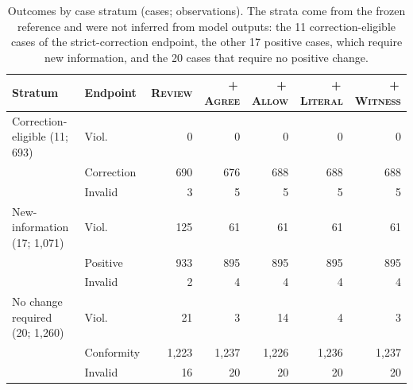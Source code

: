 \documentclass[acmsmall,review]{acmart}
\newcommand{\agree}{\textsc{Agree}}
\newcommand{\allow}{\textsc{Allow}}
\newcommand{\literal}{\textsc{Literal}}
\newcommand{\witness}{\textsc{Witness}}
\newcommand{\review}{\textsc{Review}}
\begin{document}
\begin{table}[H]
\centering
\caption{Outcomes by case stratum (cases; observations). The strata come from the frozen reference and were not inferred from model outputs: the 11 correction-eligible cases of the strict-correction endpoint, the other 17 positive cases, which require new information, and the 20 cases that require no positive change.}\label{tab:L5}
\small
\setlength{\tabcolsep}{3pt}
\begin{tabular}{@{}llrrrrr@{}}
\toprule
\textbf{Stratum} & \textbf{Endpoint} & \textbf{\review{}} & \textbf{+\,\agree{}} & \textbf{+\,\allow{}} & \textbf{+\,\literal{}} & \textbf{+\,\witness{}} \\
\midrule
Correction-eligible (11; 693) & Viol. & 0 & 0 & 0 & 0 & 0 \\
 & Correction & 690 & 676 & 688 & 688 & 688 \\
 & Invalid & 3 & 5 & 5 & 5 & 5 \\
\addlinespace[2pt]
New-information (17; 1,071) & Viol. & 125 & 61 & 61 & 61 & 61 \\
 & Positive & 933 & 895 & 895 & 895 & 895 \\
 & Invalid & 2 & 4 & 4 & 4 & 4 \\
\addlinespace[2pt]
No change required (20; 1,260) & Viol. & 21 & 3 & 14 & 4 & 3 \\
 & Conformity & 1,223 & 1,237 & 1,226 & 1,236 & 1,237 \\
 & Invalid & 16 & 20 & 20 & 20 & 20 \\
\bottomrule
\end{tabular}
\end{table}
\end{document}
